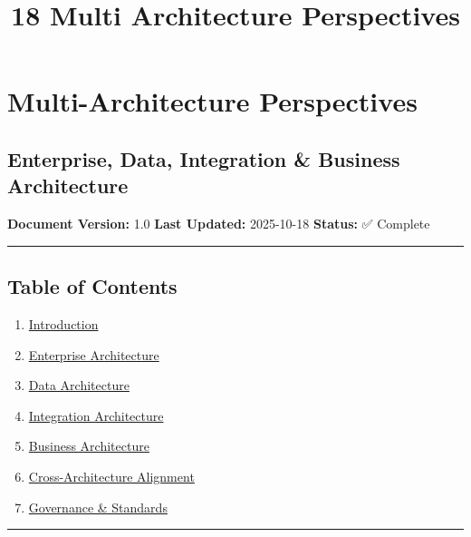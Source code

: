 \documentclass[
]{article}
\title{18 Multi Architecture Perspectives}
\author{}
\date{}
\providecommand{\tightlist}{%
  \setlength{\itemsep}{0pt}\setlength{\parskip}{0pt}}
\begin{document}
\maketitle

{
\setcounter{tocdepth}{3}
\tableofcontents
}
\hypertarget{multi-architecture-perspectives}{%
\section{Multi-Architecture
Perspectives}\label{multi-architecture-perspectives}}

\hypertarget{enterprise-data-integration-business-architecture}{%
\subsection{Enterprise, Data, Integration \& Business
Architecture}\label{enterprise-data-integration-business-architecture}}

\textbf{Document Version:} 1.0 \textbf{Last Updated:} 2025-10-18
\textbf{Status:} ✅ Complete

\begin{center}\rule{0.5\linewidth}{0.5pt}\end{center}

\hypertarget{table-of-contents}{%
\subsection{Table of Contents}\label{table-of-contents}}

\begin{enumerate}
\def\labelenumi{\arabic{enumi}.}
\tightlist
\item
  \protect\hyperlink{1-introduction}{Introduction}
\item
  \protect\hyperlink{2-enterprise-architecture}{Enterprise Architecture}
\item
  \protect\hyperlink{3-data-architecture}{Data Architecture}
\item
  \protect\hyperlink{4-integration-architecture}{Integration
  Architecture}
\item
  \protect\hyperlink{5-business-architecture}{Business Architecture}
\item
  \protect\hyperlink{6-cross-architecture-alignment}{Cross-Architecture
  Alignment}
\item
  \protect\hyperlink{7-governance--standards}{Governance \& Standards}
\end{enumerate}

\begin{center}\rule{0.5\linewidth}{0.5pt}\end{center}
\end{document}
